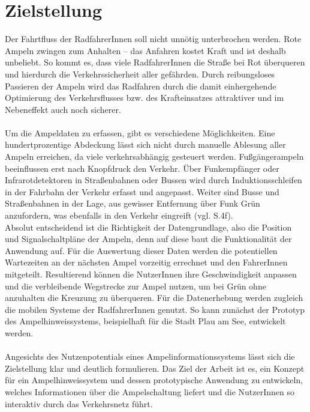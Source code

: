 \section{Zielstellung}
Der Fahrtfluss der RadfahrerInnen soll nicht unnötig unterbrochen werden. Rote Ampeln zwingen zum Anhalten -- das Anfahren kostet Kraft und ist deshalb unbeliebt. So kommt es, dass viele RadfahrerInnen die Straße bei Rot überqueren und hierdurch die Verkehrssicherheit aller gefährden. Durch reibungsloses Passieren der Ampeln wird das Radfahren durch die damit einhergehende Optimierung des Verkehrsflusses bzw. des Krafteinsatzes attraktiver und im Nebeneffekt auch noch sicherer.\\\\
Um die Ampeldaten zu erfassen, gibt es verschiedene Möglichkeiten. Eine hundertprozentige Abdeckung lässt sich nicht durch manuelle Ablesung aller Ampeln erreichen, da viele  verkehrsabhängig gesteuert werden. Fußgängerampeln beeinflussen erst nach Knopfdruck den Verkehr. Über Funkempfänger oder Infrarotdetektoren in Straßenbahnen oder Bussen wird durch Induktionsschleifen in der Fahrbahn der Verkehr erfasst und angepasst. Weiter sind Busse und Straßenbahnen in der Lage, aus gewisser Entfernung über Funk Grün anzufordern, was ebenfalls in den Verkehr eingreift (vgl. \cite{lsa_bln} S.4f). \\
Absolut entscheidend ist die Richtigkeit der Datengrundlage, also die Position und Signalschaltpläne der Ampeln, denn auf diese baut die Funktionalität der Anwendung auf.
Für die Auswertung dieser Daten werden die potentiellen Wartezeiten an der nächsten Ampel vorzeitig errechnet und den FahrerInnen mitgeteilt. Resultierend können die NutzerInnen ihre Geschwindigkeit anpassen und die verbleibende Wegstrecke zur Ampel nutzen, um bei Grün ohne anzuhalten die Kreuzung zu überqueren. Für die Datenerhebung werden zugleich die mobilen Systeme der RadfahrerInnen genutzt. So kann zunächst der Prototyp des Ampelhinweissystems, beispielhaft für die Stadt Plau am See, entwickelt werden.\\\\
Angesichts des Nutzenpotentials eines Ampelinformationssystems lässt sich die Zielstellung klar und deutlich formulieren. Das Ziel der Arbeit ist es, ein Konzept für ein Ampelhinweissystem und dessen prototypische Anwendung zu entwickeln, welches Informationen über die Ampelschaltung liefert und die NutzerInnen so interaktiv durch das Verkehrsnetz führt.
